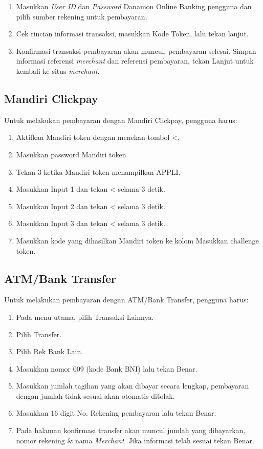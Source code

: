 \begin{enumerate}
    \item Masukkan \textit{User ID} dan \textit{Password} Danamon Online Banking pengguna dan pilih sumber rekening untuk pembayaran.
    \item Cek rincian informasi transaksi, masukkan Kode Token, lalu tekan lanjut.
    \item Konfirmasi transaksi pembayaran akan muncul, pembayaran selesai. Simpan informasi referensi \textit{merchant} dan referensi pembayaran, tekan Lanjut untuk kembali ke situs \textit{merchant}.
\end{enumerate}

\subsection{Mandiri Clickpay}
\label{subsec:mandiriclickpay}
Untuk melakukan pembayaran dengan Mandiri Clickpay, pengguna harus:

\begin{enumerate}
    \item Aktifkan Mandiri token dengan menekan tombol <.
    \item Masukkan password Mandiri token.
    \item Tekan 3 ketika Mandiri token menampilkan APPLI.
    \item Masukkan Input 1 dan tekan < selama 3 detik.
    \item Masukkan Input 2 dan tekan < selama 3 detik.
    \item Masukkan Input 3 dan tekan < selama 3 detik.
    \item Masukkan kode yang dihasilkan Mandiri token ke kolom Masukkan challenge token.
\end{enumerate}

\subsection{ATM/Bank Transfer}
\label{subsec:atmtransfer}
Untuk melakukan pembayaran dengan ATM/Bank Transfer, pengguna harus:

\begin{enumerate}
    \item Pada menu utama, pilih Transaksi Lainnya.
    \item Pilih Transfer.
    \item Pilih Rek Bank Lain.
    \item Masukkan nomor 009 (kode Bank BNI) lalu tekan Benar.
    \item Masukkan jumlah tagihan yang akan dibayar secara lengkap, pembayaran dengan jumlah tidak sesuai akan otomatis ditolak.
    \item Masukkan 16 digit No. Rekening pembayaran lalu tekan Benar.
    \item Pada halaman konfirmasi transfer akan muncul jumlah yang dibayarkan, nomor rekening \& nama \textit{Merchant}. Jika informasi telah sesuai tekan Benar.
\end{enumerate}

